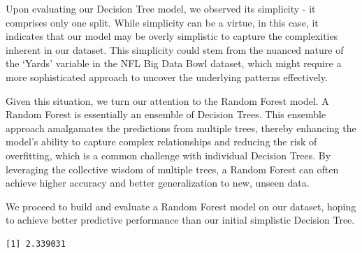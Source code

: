 \documentclass[
  super,
  preprint,
  3p]{elsarticle}
\newenvironment{Shaded}{\begin{snugshade}}{\end{snugshade}}
\newcommand{\AttributeTok}[1]{\textcolor[rgb]{0.40,0.45,0.13}{#1}}
\newcommand{\CommentTok}[1]{\textcolor[rgb]{0.37,0.37,0.37}{#1}}
\newcommand{\DecValTok}[1]{\textcolor[rgb]{0.68,0.00,0.00}{#1}}
\newcommand{\FloatTok}[1]{\textcolor[rgb]{0.68,0.00,0.00}{#1}}
\newcommand{\FunctionTok}[1]{\textcolor[rgb]{0.28,0.35,0.67}{#1}}
\newcommand{\NormalTok}[1]{\textcolor[rgb]{0.00,0.23,0.31}{#1}}
\newcommand{\OtherTok}[1]{\textcolor[rgb]{0.00,0.23,0.31}{#1}}
\newcommand{\SpecialCharTok}[1]{\textcolor[rgb]{0.37,0.37,0.37}{#1}}
\begin{document}
Upon evaluating our Decision Tree model, we observed its simplicity - it
comprises only one split. While simplicity can be a virtue, in this
case, it indicates that our model may be overly simplistic to capture
the complexities inherent in our dataset. This simplicity could stem
from the nuanced nature of the `Yards' variable in the NFL Big Data Bowl
dataset, which might require a more sophisticated approach to uncover
the underlying patterns effectively.

Given this situation, we turn our attention to the Random Forest model.
A Random Forest is essentially an ensemble of Decision Trees. This
ensemble approach amalgamates the predictions from multiple trees,
thereby enhancing the model's ability to capture complex relationships
and reducing the risk of overfitting, which is a common challenge with
individual Decision Trees. By leveraging the collective wisdom of
multiple trees, a Random Forest can often achieve higher accuracy and
better generalization to new, unseen data.

We proceed to build and evaluate a Random Forest model on our dataset,
hoping to achieve better predictive performance than our initial
simplistic Decision Tree.

\begin{Shaded}
\end{Shaded}

\begin{verbatim}
[1] 2.339031
\end{verbatim}
\end{document}

